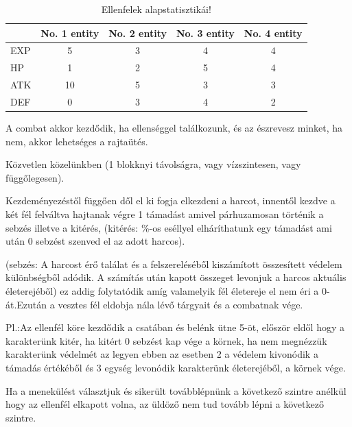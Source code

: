 \begin{table}[!ht]
\centering
\caption{Ellenfelek alapstatisztikái!}
\label{tab:table2}
\begin{tabular}{|l|c|c|c|c|}
\hline
 & No. 1 entity & No. 2 entity & No. 3 entity & No. 4 entity  \\
\hline
EXP & 5 & 3 & 4 & 4 \\
\hline
HP & 1 & 2 & 5 & 4 \\
\hline
ATK & 10 & 5 & 3 & 3 \\
\hline
DEF & 0 & 3 & 4 & 2 \\
\hline
\end{tabular}
\end{table}

\newpage
{}

A combat akkor kezdődik, ha ellenséggel találkozunk, és az észrevesz minket, ha nem, akkor lehetséges a rajtaütés.


Közvetlen közelünkben (1 blokknyi távolságra, vagy vízszintesen, vagy függőlegesen).

Kezdeményezéstől függően dől el ki fogja elkezdeni a harcot, innentől kezdve a két fél felváltva hajtanak végre 1 támadást amivel párhuzamosan történik a sebzés illetve a kitérés, (kitérés: \%-os eséllyel elháríthatunk egy támadást ami után 0 sebzést szenved el az adott harcos).

(sebzés: A harcost érő találat és a felszereléséből kiszámított összesített védelem különbségből adódik. A számítás után kapott összeget levonjuk a harcos aktuális életerejéből) ez addig folytatódik amíg valamelyik fél életereje el nem éri a 0-át.Ezután a vesztes fél eldobja nála lévő tárgyait és a combatnak vége.


Pl.:Az ellenfél köre kezdődik a csatában és belénk ütne 5-öt, először eldől hogy a karakterünk kitér, ha kitért 0 sebzést kap vége a körnek, ha nem megnézzük karakterünk védelmét az legyen ebben az esetben 2 a védelem kivonódik a támadás értékéből és 3 egység levonódik karakterünk életerejéből, a körnek vége.

Ha a menekülést választjuk és sikerült továbblépnünk a következő szintre anélkül hogy az ellenfél elkapott volna, az üldöző nem tud tovább lépni a következő szintre.


